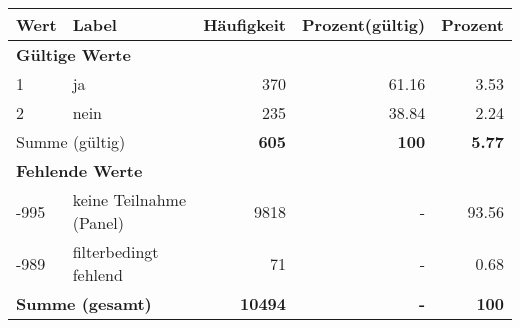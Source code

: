      \begin{longtable}{lXrrr}
     \toprule
     \textbf{Wert} & \textbf{Label} & \textbf{Häufigkeit} & \textbf{Prozent(gültig)} & \textbf{Prozent} \\
     \endhead
     \midrule
     \multicolumn{5}{l}{\textbf{Gültige Werte}}\\

     1 &
     \multicolumn{1}{X}{ ja   } &


       \num{370} &
       \num[round-mode=places,round-precision=2]{61,16} &
         \num[round-mode=places,round-precision=2]{3,53} \\

     2 &
     \multicolumn{1}{X}{ nein   } &


       \num{235} &
       \num[round-mode=places,round-precision=2]{38,84} &
         \num[round-mode=places,round-precision=2]{2,24} \\
     \midrule
     \multicolumn{2}{l}{Summe (gültig)} &
       \textbf{\num{605}} &
     \textbf{100} &
       \textbf{\num[round-mode=places,round-precision=2]{5,77}} \\
     \multicolumn{5}{l}{\textbf{Fehlende Werte}}\\
       -995 &
       keine Teilnahme (Panel) &
         \num{9818} &
        - &
         \num[round-mode=places,round-precision=2]{93,56} \\
       -989 &
       filterbedingt fehlend &
         \num{71} &
        - &
         \num[round-mode=places,round-precision=2]{0,68} \\
     \midrule
     \multicolumn{2}{l}{\textbf{Summe (gesamt)}} &
          \textbf{\num{10494}} &
        \textbf{-} &
        \textbf{100} \\
     \bottomrule
     \end{longtable}
     
